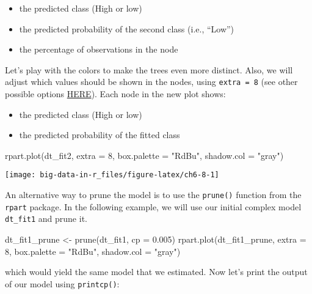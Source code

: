 \documentclass[
]{book}
\newenvironment{Shaded}{\begin{snugshade}}{\end{snugshade}}
\newcommand{\AttributeTok}[1]{\textcolor[rgb]{0.77,0.63,0.00}{#1}}
\newcommand{\DecValTok}[1]{\textcolor[rgb]{0.00,0.00,0.81}{#1}}
\newcommand{\FloatTok}[1]{\textcolor[rgb]{0.00,0.00,0.81}{#1}}
\newcommand{\FunctionTok}[1]{\textcolor[rgb]{0.00,0.00,0.00}{#1}}
\newcommand{\NormalTok}[1]{#1}
\newcommand{\OtherTok}[1]{\textcolor[rgb]{0.56,0.35,0.01}{#1}}
\newcommand{\StringTok}[1]{\textcolor[rgb]{0.31,0.60,0.02}{#1}}
\providecommand{\tightlist}{%
  \setlength{\itemsep}{0pt}\setlength{\parskip}{0pt}}
\begin{document}
\begin{itemize}
\tightlist
\item
  the predicted class (High or low)
\item
  the predicted probability of the second class (i.e., ``Low'')
\item
  the percentage of observations in the node
\end{itemize}

Let's play with the colors to make the trees even more distinct. Also, we will adjust which values should be shown in the nodes, using \texttt{extra\ =\ 8} (see other possible options \href{http://www.milbo.org/doc/prp.pdf}{HERE}). Each node in the new plot shows:

\begin{itemize}
\tightlist
\item
  the predicted class (High or low)
\item
  the predicted probability of the fitted class
\end{itemize}

\begin{Shaded}
\begin{Highlighting}[]
\FunctionTok{rpart.plot}\NormalTok{(dt\_fit2, }\AttributeTok{extra =} \DecValTok{8}\NormalTok{, }\AttributeTok{box.palette =} \StringTok{"RdBu"}\NormalTok{, }\AttributeTok{shadow.col =} \StringTok{"gray"}\NormalTok{)}
\end{Highlighting}
\end{Shaded}

\texttt{[image: big-data-in-r\_files/figure-latex/ch6-8-1]}

An alternative way to prune the model is to use the \texttt{prune()} function from the \texttt{rpart} package. In the following example, we will use our initial complex model \texttt{dt\_fit1} and prune it.

\begin{Shaded}
\begin{Highlighting}[]
\NormalTok{dt\_fit1\_prune }\OtherTok{\textless{}{-}} \FunctionTok{prune}\NormalTok{(dt\_fit1, }\AttributeTok{cp =} \FloatTok{0.005}\NormalTok{)}
\FunctionTok{rpart.plot}\NormalTok{(dt\_fit1\_prune, }\AttributeTok{extra =} \DecValTok{8}\NormalTok{, }\AttributeTok{box.palette =} \StringTok{"RdBu"}\NormalTok{, }\AttributeTok{shadow.col =} \StringTok{"gray"}\NormalTok{)}
\end{Highlighting}
\end{Shaded}

which would yield the same model that we estimated. Now let's print the output of our model using \texttt{printcp()}:
\end{document}
